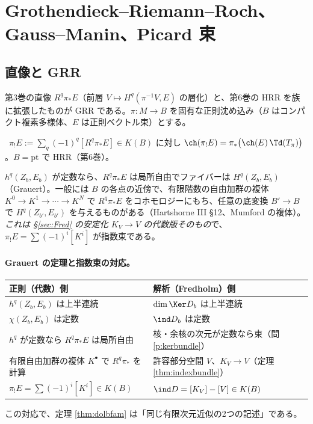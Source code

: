 
\section{Grothendieck--Riemann--Roch、Gauss--Manin、Picard 束}\label{sec:GRR}
\subsection{直像と GRR}
第3巻の直像 $R^q\pi_*E$（前層 $V\mapsto H^q(\pi^{-1}V,E)$ の層化）と、第6巻の HRR を族に拡張したものが GRR である。$\pi:M\to B$ を固有な正則沈め込み（$B$ はコンパクト複素多様体、$E$ は正則ベクトル束）とする。
\begin{thm}[GRR]\label{thm:GRR}\tC\
$\pi_!E:=\sum_q(-1)^q[R^q\pi_*E]\in K(B)$ に対し $\ch(\pi_!E)=\pi_*\bigl(\ch(E)\,\Td(T_\pi)\bigr)$。$B=\mathrm{pt}$ で HRR（第6巻）。
\end{thm}
$h^q(Z_b,E_b)$ が定数なら、$R^q\pi_*E$ は局所自由でファイバーは $H^q(Z_b,E_b)$（Grauert）。一般には $B$ の各点の近傍で、有限階数の自由加群の複体 $K^0\to K^1\to\cdots\to K^N$ で $R^q\pi_*E$ をコホモロジーにもち、任意の底変換 $B'\to B$ で $H^q(Z_{b'},E_{b'})$ を与えるものがある（Hartshorne III \S12、Mumford の複体）。\emph{これは \S\ref{sec:Fred} の安定化 $K_V\to V$ の代数版そのもの}で、$\pi_!E=\sum(-1)^i[K^i]$ が指数束である。

\paragraph{Grauert の定理と指数束の対応。}
\begin{center}
\renewcommand{\arraystretch}{1.2}
\begin{tabular}{>{\raggedright\arraybackslash}p{5.2cm}>{\raggedright\arraybackslash}p{8.8cm}}
\toprule
正則（代数）側 & 解析（Fredholm）側\\
\midrule
$h^q(Z_b,E_b)$ は上半連続 & $\dim\Ker D_b$ は上半連続\\
$\chi(Z_b,E_b)$ は定数 & $\ind D_b$ は定数\\
$h^q$ が定数なら $R^q\pi_*E$ は局所自由 & 核・余核の次元が定数なら束（問 \ref{p:kerbundle}）\\
有限自由加群の複体 $K^\bullet$ で $R^q\pi_*$ を計算 & 許容部分空間 $V$、$K_V\to V$（定理 \ref{thm:indexbundle}）\\
$\pi_!E=\sum(-1)^i[K^i]\in K(B)$ & $\ind D=[K_V]-[V]\in K(B)$\\
\bottomrule
\end{tabular}
\end{center}
この対応で、定理 \ref{thm:dolbfam} は「同じ有限次元近似の2つの記述」である。

